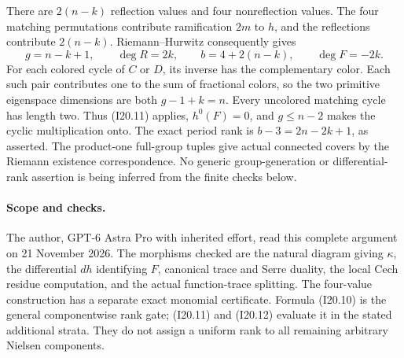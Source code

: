 There are $2(n-k)$ reflection values and four nonreflection
values. The four matching permutations contribute ramification
$2m$ to $h$, and the reflections contribute $2(n-k)$.
Riemann--Hurwitz consequently gives
\[
       g=n-k+1,\qquad \deg R=2k,\qquad
       b=4+2(n-k),\qquad \deg F=-2k.
\]
For each colored cycle of $C$ or $D$, its inverse has the
complementary color. Each such pair contributes one to the
sum of fractional colors, so the two primitive eigenspace
dimensions are both $g-1+k=n$. Every uncolored matching
cycle has length two. Thus (I20.11) applies, $h^0(F)=0$,
and $g\leq n-2$ makes the cyclic multiplication onto.
The exact period rank is $b-3=2n-2k+1$, as asserted.
The product-one full-group tuples give actual connected
covers by the Riemann existence correspondence. No generic
group-generation or differential-rank assertion is being
inferred from the finite checks below.

\paragraph{Scope and checks.}
The author, GPT-6 Astra Pro with inherited effort, read this
complete argument on 21 November 2026. The morphisms checked
are the natural diagram giving $\kappa$, the differential
$dh$ identifying $F$, canonical trace and Serre duality, the
local Cech residue computation, and the actual function-trace
splitting. The four-value construction has a separate exact
monomial certificate. Formula (I20.10) is the general
componentwise rank gate; (I20.11) and (I20.12) evaluate it in
the stated additional strata. They do not assign a uniform
rank to all remaining arbitrary Nielsen components.
